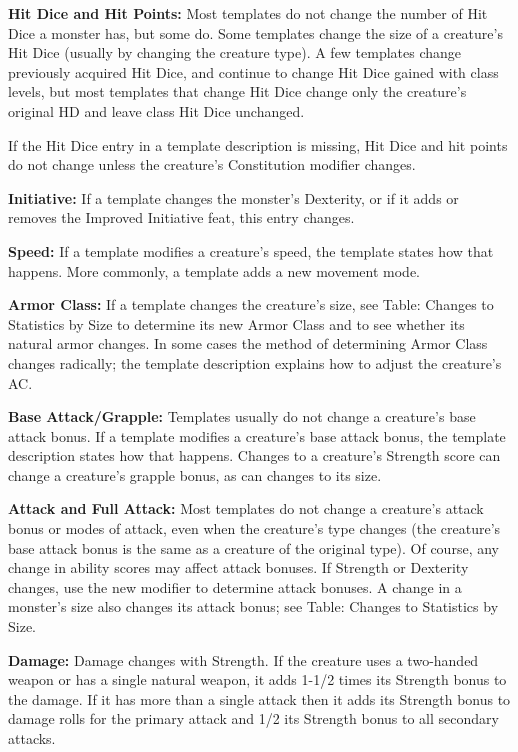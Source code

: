\documentclass{article}
\begin{document}
\textbf{Hit Dice and Hit Points:} Most templates do not change the number of Hit 
Dice a monster has, but some do. Some templates change the size of a creature's 
Hit Dice (usually by changing the creature type). A few templates change previously 
acquired Hit Dice, and continue to change Hit Dice gained with class levels, but 
most templates that change Hit Dice change only the creature's original HD and 
leave class Hit Dice unchanged.

If the Hit Dice entry in a template description is missing, Hit Dice and hit points 
do not change unless the creature's Constitution modifier changes.

\textbf{Initiative: }If a template changes the monster's Dexterity, or if it adds 
or removes the Improved Initiative feat, this entry changes.

\textbf{Speed:} If a template modifies a creature's speed, the template states 
how that happens. More commonly, a template adds a new movement mode.

\textbf{Armor Class:} If a template changes the creature's size, see Table: Changes 
to Statistics by Size to determine its new Armor Class and to see whether its natural 
armor changes. In some cases the method of determining Armor Class changes radically; 
the template description explains how to adjust the creature's AC.

\textbf{Base Attack/Grapple:} Templates usually do not change a creature's base 
attack bonus. If a template modifies a creature's base attack bonus, the template 
description states how that happens. Changes to a creature's Strength score can 
change a creature's grapple bonus, as can changes to its size.

\textbf{Attack and Full Attack:} Most templates do not change a creature's attack 
bonus or modes of attack, even when the creature's type changes (the creature's 
base attack bonus is the same as a creature of the original type). Of course, any 
change in ability scores may affect attack bonuses. If Strength or Dexterity changes, 
use the new modifier to determine attack bonuses. A change in a monster's size 
also changes its attack bonus; see Table: Changes to Statistics by Size.

\textbf{Damage:} Damage changes with Strength. If the creature uses a two-handed 
weapon or has a single natural weapon, it adds 1-1/2 times its Strength bonus to 
the damage. If it has more than a single attack then it adds its Strength bonus 
to damage rolls for the primary attack and 1/2 its Strength bonus to all secondary 
attacks.
\end{document}
